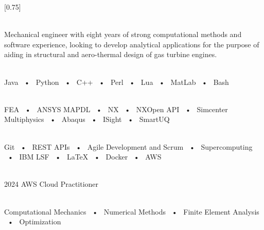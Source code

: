 \documentclass[darkhipster]{simplehipstercv}
\begin{document}
\setlength{\columnsep}{1.5cm}
[0.75]
\begin{paracol}{2}

\paracolbackgroundoptions



\footnotesize
{\setasidefontcolour
\flushleft
\begin{center}
\end{center}

\\[0.5em]

{\footnotesize
Mechanical engineer with eight years of strong computational methods and software experience, looking to develop analytical
 applications for the purpose of aiding in structural and aero-thermal design of gas turbine engines.}
\bigskip


 \\[0.5em]

Java ~•~ Python ~•~ C++ ~•~ Perl ~•~ Lua ~•~ MatLab ~•~ Bash

\bigskip

\\[0.5em]

FEA ~•~ ANSYS MAPDL ~•~ NX ~•~ NXOpen API ~•~ Simcenter Multiphysics ~•~ Abaqus ~•~ ISight ~•~ SmartUQ

\bigskip

\\[0.5em]

Git ~•~ REST APIs ~•~ Agile Development and Scrum ~•~ Supercomputing ~•~ IBM LSF ~•~ LaTeX ~•~ Docker ~•~ AWS

\bigskip

\\[0.5em]

2024 AWS Cloud Practitioner

\bigskip

\\[0.5em]

Computational Mechanics ~•~ Numerical Methods ~•~ Finite Element Analysis ~•~ Optimization

\vspace{4em}

}
\end{paracol}
\end{document}
